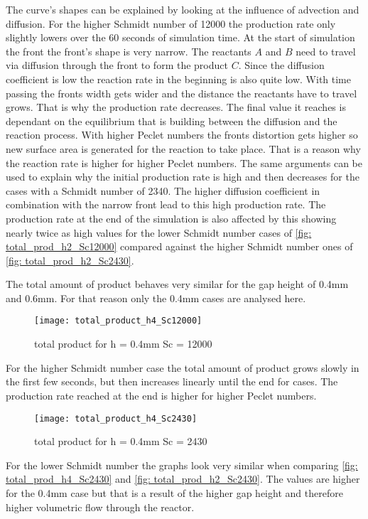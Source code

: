 \documentclass[../thesis.tex]{subfiles}
\begin{document}
The curve's shapes can be explained by looking at the influence of advection and diffusion. For the higher Schmidt number of 12000 the production rate only slightly lowers over the 60 seconds of simulation time. At the start of simulation the front the front's shape is very narrow. The reactants $A$ and $B$ need to travel via diffusion through the front to form the product $C$. Since the diffusion coefficient is low the reaction rate in the beginning is also quite low. With time passing the fronts width gets wider and the distance the reactants have to travel grows. That is why the production rate decreases. The final value it reaches is dependant on the equilibrium that is building between the diffusion and the reaction process. With higher Peclet numbers the fronts distortion gets higher so new surface area is generated for the reaction to take place. That is a reason why the reaction rate is higher for higher Peclet numbers.
The same arguments can be used to explain why the initial production rate is high and then decreases for the cases with a Schmidt number of 2340. The higher diffusion coefficient in combination with the narrow front lead to this high production rate. The production rate at the end of the simulation is also affected by this showing nearly twice as high values for the lower Schmidt number cases of \autoref{fig: total_prod_h2_Sc12000} compared against the higher Schmidt number ones of \autoref{fig: total_prod_h2_Sc2430}.
\newline

The total amount of product behaves very similar for the gap height of 0.4mm and 0.6mm. For that reason only the 0.4mm cases are analysed here. 
\begin{figure}[htb]
	\centering
	\texttt{[image: total\_product\_h4\_Sc12000]}
	\caption{total product for  h = 0.4mm Sc = 12000}
	\label{fig: total_prod_h4_Sc12000}
\end{figure}
For the higher Schmidt number case the total amount of product grows slowly in the first few seconds, but then increases linearly until the end for cases. The production rate reached at the end is higher for higher Peclet numbers. 
\begin{figure}[htb]
	\centering
	\texttt{[image: total\_product\_h4\_Sc2430]}
	\caption{total product for  h = 0.4mm Sc = 2430}
	\label{fig: total_prod_h4_Sc2430}
\end{figure}

For the lower Schmidt number the graphs look very similar when comparing \autoref{fig: total_prod_h4_Sc2430} and \autoref{fig: total_prod_h2_Sc2430}. The values are higher for the 0.4mm case but that is a result of the higher gap height and therefore higher volumetric flow through the reactor.
\end{document}
